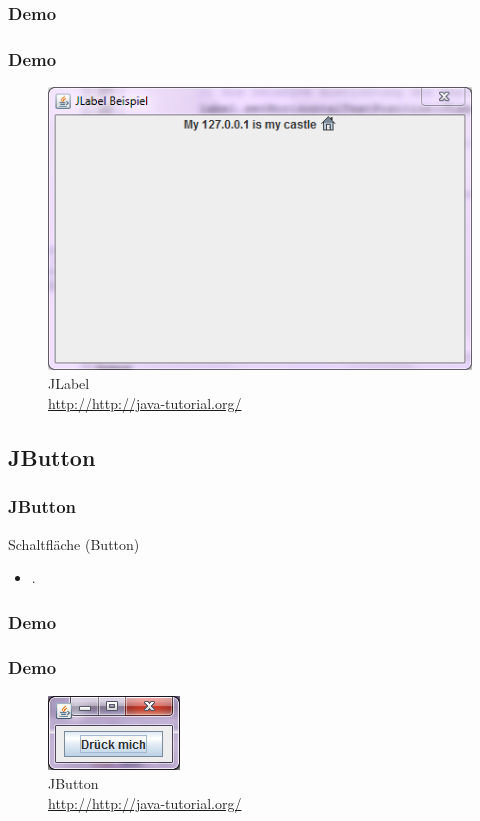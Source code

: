 \documentclass[xcolor=dvipsnames]{beamer}
\begin{document}
\subsubsection{Demo}
\begin{frame}
  \frametitle{Demo}
	\begin{figure}
		\includegraphics[scale=0.8]{images/jlabel.PNG}
		\caption{JLabel \\ \tiny{\textcolor{gray}{\url{http://http://java-tutorial.org/}}}}
		\end{figure}
\end{frame}


\subsection{JButton}
\begin{frame} %
  \frametitle{JButton} %
  \begin{block}{Schaltfläche (Button)}
	  \begin{itemize}
		\item .
	  \end{itemize}
  \end{block}
\end{frame}

\subsubsection{Demo}
\begin{frame}
  \frametitle{Demo}
	\begin{figure}
		\includegraphics[scale=1.0]{images/jbutton.PNG}
		\caption{JButton \\ \tiny{\textcolor{gray}{\url{http://http://java-tutorial.org/}}}}
		\end{figure}
\end{frame}
\end{document}
